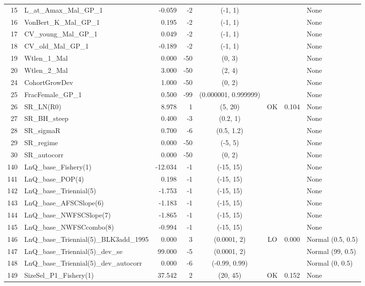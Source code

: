 \documentclass[12pt,]{article}
\begin{document}
\begin{landscape}
\begin{longtable}{rlrrcccl}
  15 & L\_at\_Amax\_Mal\_GP\_1 & -0.059 & -2 & (-1, 1) &  &  & None \\ 
  16 & VonBert\_K\_Mal\_GP\_1 & 0.195 & -2 & (-1, 1) &  &  & None \\ 
  17 & CV\_young\_Mal\_GP\_1 & 0.049 & -2 & (-1, 1) &  &  & None \\ 
  18 & CV\_old\_Mal\_GP\_1 & -0.189 & -2 & (-1, 1) &  &  & None \\ 
  19 & Wtlen\_1\_Mal & 0.000 & -50 & (0, 3) &  &  & None \\ 
  20 & Wtlen\_2\_Mal & 3.000 & -50 & (2, 4) &  &  & None \\ 
  24 & CohortGrowDev & 1.000 & -50 & (0, 2) &  &  & None \\ 
  25 & FracFemale\_GP\_1 & 0.500 & -99 & (0.000001, 0.999999) &  &  & None \\ 
  26 & SR\_LN(R0) & 8.978 & 1 & (5, 20) & OK & 0.104 & None \\ 
  27 & SR\_BH\_steep & 0.400 & -3 & (0.2, 1) &  &  & None \\ 
  28 & SR\_sigmaR & 0.700 & -6 & (0.5, 1.2) &  &  & None \\ 
  29 & SR\_regime & 0.000 & -50 & (-5, 5) &  &  & None \\ 
  30 & SR\_autocorr & 0.000 & -50 & (0, 2) &  &  & None \\ 
  140 & LnQ\_base\_Fishery(1) & -12.034 & -1 & (-15, 15) &  &  & None \\ 
  141 & LnQ\_base\_POP(4) & 0.198 & -1 & (-15, 15) &  &  & None \\ 
  142 & LnQ\_base\_Triennial(5) & -1.753 & -1 & (-15, 15) &  &  & None \\ 
  143 & LnQ\_base\_AFSCSlope(6) & -1.183 & -1 & (-15, 15) &  &  & None \\ 
  144 & LnQ\_base\_NWFSCSlope(7) & -1.865 & -1 & (-15, 15) &  &  & None \\ 
  145 & LnQ\_base\_NWFSCcombo(8) & -0.994 & -1 & (-15, 15) &  &  & None \\ 
  146 & LnQ\_base\_Triennial(5)\_BLK3add\_1995 & 0.000 & 3 & (0.0001, 2) & LO & 0.000 & Normal (0.5, 0.5) \\ 
  147 & LnQ\_base\_Triennial(5)\_dev\_se & 99.000 & -5 & (0.0001, 2) &  &  & Normal (99, 0.5) \\ 
  148 & LnQ\_base\_Triennial(5)\_dev\_autocorr & 0.000 & -6 & (-0.99, 0.99) &  &  & Normal (0, 0.5) \\ 
  149 & SizeSel\_P1\_Fishery(1) & 37.542 & 2 & (20, 45) & OK & 0.152 & None \\ 

\end{longtable}
\end{landscape}
\end{document}
